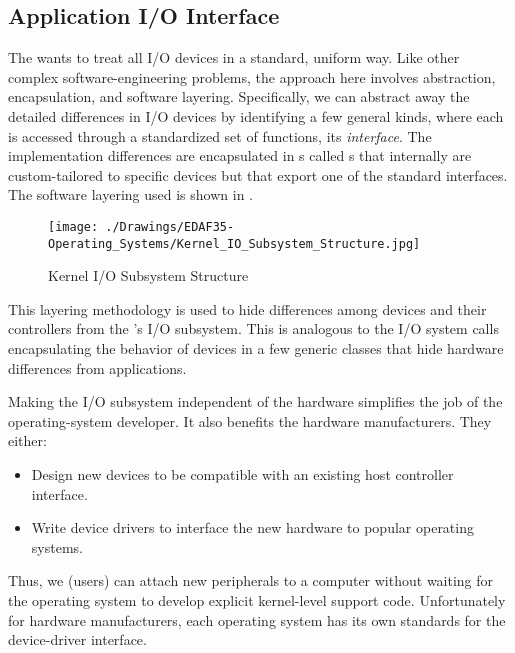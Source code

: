 \subsection{Application I/O Interface}\label{subsec:Application_IO_Interface}
The  wants to treat all I/O devices in a standard, uniform way.
Like other complex software-engineering problems, the approach here involves abstraction, encapsulation, and software layering.
Specifically, we can abstract away the detailed differences in I/O devices by identifying a few general kinds, where each is accessed through a standardized set of functions, its \emph{interface}.
The implementation differences are encapsulated in s called s that internally are custom-tailored to specific devices but that export one of the standard interfaces.
The software layering used is shown in .

\begin{figure}[h!tbp]
  \centering
  \texttt{[image: ./Drawings/EDAF35-Operating\_Systems/Kernel\_IO\_Subsystem\_Structure.jpg]}
  \caption{Kernel I/O Subsystem Structure}
  \label{fig:Kernel_IO_Subsystem_Structure}
\end{figure}

This layering methodology is used to hide differences among devices and their controllers from the 's I/O subsystem.
This is analogous to the I/O system calls encapsulating the behavior of devices in a few generic classes that hide hardware differences from applications.

Making the I/O subsystem independent of the hardware simplifies the job of the operating-system developer.
It also benefits the hardware manufacturers.
They either:
\begin{itemize}[noitemsep]
\item Design new devices to be compatible with an existing host controller interface.
\item Write device drivers to interface the new hardware to popular operating systems.
\end{itemize}

Thus, we (users) can attach new peripherals to a computer without waiting for the operating system to develop explicit kernel-level support code.
Unfortunately for hardware manufacturers, each operating system has its own standards for the device-driver interface.

